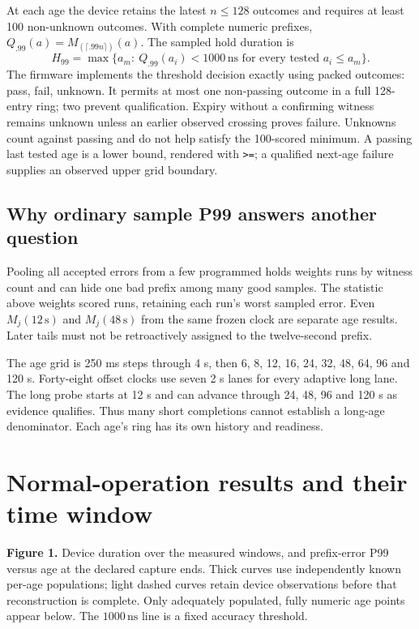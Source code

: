 \documentclass[11pt,letterpaper]{article}
\newcommand{\ns}{\,\mathrm{ns}}\newcommand{\us}{\,\mu\mathrm{s}}
\newcommand{\code}[1]{\texttt{\small #1}}
\begin{document}
At each age the device retains the latest $n\leq128$ outcomes and requires at least 100 non-unknown outcomes. With complete numeric prefixes, $Q_{.99}(a)=M_{(\lceil .99n\rceil)}(a)$. The sampled hold duration is
\[
 H_{99}=\max\{a_m:\ Q_{.99}(a_i)<1000\ns\text{ for every tested }a_i\leq a_m\}.
\]
The firmware implements the threshold decision exactly using packed outcomes: pass, fail, unknown. It permits at most one non-passing outcome in a full 128-entry ring; two prevent qualification. Expiry without a confirming witness remains unknown unless an earlier observed crossing proves failure. Unknowns count against passing and do not help satisfy the 100-scored minimum. A passing last tested age is a lower bound, rendered with \code{>=}; a qualified next-age failure supplies an observed upper grid boundary.

\subsection{Why ordinary sample P99 answers another question}
Pooling all accepted errors from a few programmed holds weights runs by witness count and can hide one bad prefix among many good samples. The statistic above weights scored runs, retaining each run's worst sampled error. Even $M_j(12\,\mathrm{s})$ and $M_j(48\,\mathrm{s})$ from the same frozen clock are separate age results. Later tails must not be retroactively assigned to the twelve-second prefix.

The age grid is 250 ms steps through 4 s, then 6, 8, 12, 16, 24, 32, 48, 64, 96 and 120 s. Forty-eight offset clocks use seven 2 s lanes for every adaptive long lane. The long probe starts at 12 s and can advance through 24, 48, 96 and 120 s as evidence qualifies. Thus many short completions cannot establish a long-age denominator. Each age's ring has its own history and readiness.
\newpage
\section{Normal-operation results and their time window}
\PrimaryResults{}

\begin{center}

\end{center}\vspace{-5pt}
{\small\textbf{Figure 1.} Device duration over the measured windows, and prefix-error P99 versus age at the declared capture ends. Thick curves use independently known per-age populations; light dashed curves retain device observations before that reconstruction is complete. Only adequately populated, fully numeric age points appear below. The $1000\ns$ line is a fixed accuracy threshold.}
\end{document}
